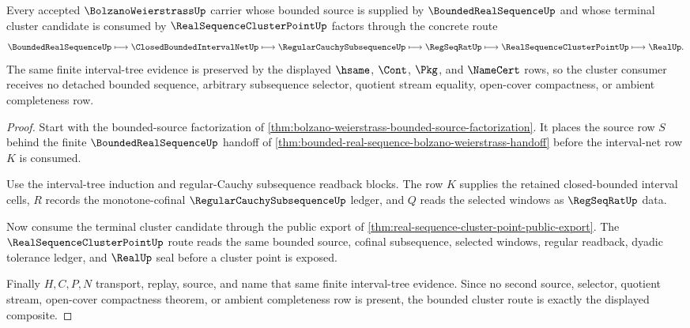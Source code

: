 \begin{theorem}
\label{thm:bolzano-weierstrass-bounded-cluster-route}
Every accepted $\BolzanoWeierstrassUp$ carrier whose bounded source is supplied by $\BoundedRealSequenceUp$ and whose terminal cluster candidate is consumed by $\RealSequenceClusterPointUp$ factors through the concrete route
$$
\BoundedRealSequenceUp \longmapsto \ClosedBoundedIntervalNetUp \longmapsto \RegularCauchySubsequenceUp \longmapsto \RegSeqRatUp \longmapsto \RealSequenceClusterPointUp \longmapsto \RealUp .
$$
The same finite interval-tree evidence is preserved by the displayed $\hsame$, $\Cont$, $\Pkg$, and $\NameCert$ rows, so the cluster consumer receives no detached bounded sequence, arbitrary subsequence selector, quotient stream equality, open-cover compactness, or ambient completeness row.
\end{theorem}
\begin{proof}
Start with the bounded-source factorization of \autoref{thm:bolzano-weierstrass-bounded-source-factorization}. It places the source row $S$ behind the finite $\BoundedRealSequenceUp$ handoff of \autoref{thm:bounded-real-sequence-bolzano-weierstrass-handoff} before the interval-net row $K$ is consumed.

Use the interval-tree induction and regular-Cauchy subsequence readback blocks. The row $K$ supplies the retained closed-bounded interval cells, $R$ records the monotone-cofinal $\RegularCauchySubsequenceUp$ ledger, and $Q$ reads the selected windows as $\RegSeqRatUp$ data.

Now consume the terminal cluster candidate through the public export of \autoref{thm:real-sequence-cluster-point-public-export}. The $\RealSequenceClusterPointUp$ route reads the same bounded source, cofinal subsequence, selected windows, regular readback, dyadic tolerance ledger, and $\RealUp$ seal before a cluster point is exposed.

Finally $H,C,P,N$ transport, replay, source, and name that same finite interval-tree evidence. Since no second source, selector, quotient stream, open-cover compactness theorem, or ambient completeness row is present, the bounded cluster route is exactly the displayed composite.
\end{proof}

